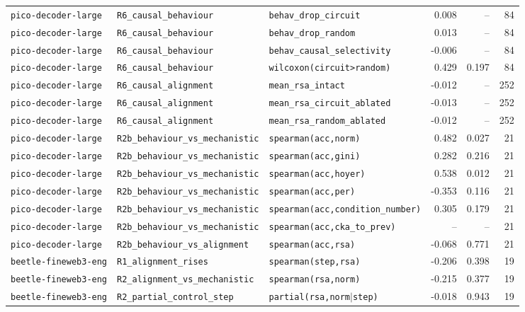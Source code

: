 \begin{longtable}{lllrrr}
\texttt{pico-decoder-large} & \texttt{R6\_causal\_behaviour} & \texttt{behav\_drop\_circuit} & 0.008 & -- & 84 \\
\texttt{pico-decoder-large} & \texttt{R6\_causal\_behaviour} & \texttt{behav\_drop\_random} & 0.013 & -- & 84 \\
\texttt{pico-decoder-large} & \texttt{R6\_causal\_behaviour} & \texttt{behav\_causal\_selectivity} & -0.006 & -- & 84 \\
\texttt{pico-decoder-large} & \texttt{R6\_causal\_behaviour} & \texttt{wilcoxon(circuit>random)} & 0.429 & 0.197 & 84 \\
\texttt{pico-decoder-large} & \texttt{R6\_causal\_alignment} & \texttt{mean\_rsa\_intact} & -0.012 & -- & 252 \\
\texttt{pico-decoder-large} & \texttt{R6\_causal\_alignment} & \texttt{mean\_rsa\_circuit\_ablated} & -0.013 & -- & 252 \\
\texttt{pico-decoder-large} & \texttt{R6\_causal\_alignment} & \texttt{mean\_rsa\_random\_ablated} & -0.012 & -- & 252 \\
\texttt{pico-decoder-large} & \texttt{R2b\_behaviour\_vs\_mechanistic} & \texttt{spearman(acc,norm)} & 0.482 & 0.027 & 21 \\
\texttt{pico-decoder-large} & \texttt{R2b\_behaviour\_vs\_mechanistic} & \texttt{spearman(acc,gini)} & 0.282 & 0.216 & 21 \\
\texttt{pico-decoder-large} & \texttt{R2b\_behaviour\_vs\_mechanistic} & \texttt{spearman(acc,hoyer)} & 0.538 & 0.012 & 21 \\
\texttt{pico-decoder-large} & \texttt{R2b\_behaviour\_vs\_mechanistic} & \texttt{spearman(acc,per)} & -0.353 & 0.116 & 21 \\
\texttt{pico-decoder-large} & \texttt{R2b\_behaviour\_vs\_mechanistic} & \texttt{spearman(acc,condition\_number)} & 0.305 & 0.179 & 21 \\
\texttt{pico-decoder-large} & \texttt{R2b\_behaviour\_vs\_mechanistic} & \texttt{spearman(acc,cka\_to\_prev)} & -- & -- & 21 \\
\texttt{pico-decoder-large} & \texttt{R2b\_behaviour\_vs\_alignment} & \texttt{spearman(acc,rsa)} & -0.068 & 0.771 & 21 \\
\texttt{beetle-fineweb3-eng} & \texttt{R1\_alignment\_rises} & \texttt{spearman(step,rsa)} & -0.206 & 0.398 & 19 \\
\texttt{beetle-fineweb3-eng} & \texttt{R2\_alignment\_vs\_mechanistic} & \texttt{spearman(rsa,norm)} & -0.215 & 0.377 & 19 \\
\texttt{beetle-fineweb3-eng} & \texttt{R2\_partial\_control\_step} & \texttt{partial(rsa,norm$\mid$step)} & -0.018 & 0.943 & 19 \\

\end{longtable}
